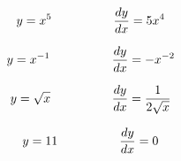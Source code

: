 \vskip 20pt

$$y = x^5 \hbox{\hskip 50pt} {dy \over dx} = 5x^4$$

\vskip 20pt

$$y = x^{-1} \hbox{\hskip 50pt} {dy \over dx} = -x^{-2}$$

\vskip 20pt

$$y = \sqrt{x} \hbox{\hskip 50pt} {dy \over dx} = {1 \over {2 \sqrt{x}}}$$

\vskip 20pt

$$y = 11 \hbox{\hskip 50pt} {dy \over dx} = 0$$












